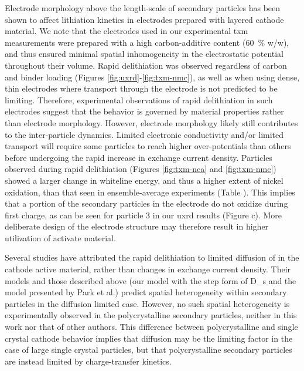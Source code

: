 \documentclass{article}
\begin{document}
Electrode morphology above the length-scale of secondary particles has
been shown to affect lithiation kinetics in electrodes prepared with
layered cathode
material\cite{battaglia2012,mukherjee2018,mukherjee2020,zhao2022}. We
note that the electrodes used in our experimental \gls{txm}
measurements were prepared with a high carbon-additive content
(\SI{60}{\percent} w/w), and thus ensured minimal spatial
inhomogeneity in the electrostatic potential throughout their
volume. Rapid delithiation was observed regardless of carbon and
binder loading (Figures \ref{fig:uxrd}-\ref{fig:txm-nmc}), as well as
when using dense, thin electrodes\cite{chueh2021} where transport
through the electrode is not predicted to be
limiting\cite{mukherjee2018}. Therefore, experimental observations of
rapid delithiation in such electrodes suggest that the behavior is
governed by material properties rather than electrode
morphology. However, electrode morphology likely still contributes to
the inter-particle dynamics. Limited electronic conductivity and/or
limited  transport will require some particles to reach
higher over-potentials than others before undergoing the rapid
increase in exchange current density. Particles observed during rapid
delithiation (Figures \ref{fig:txm-nca} and \ref{fig:txm-nmc}) showed
a larger change in whiteline energy, and thus a higher extent of
nickel oxidation, than that seen in ensemble-average experiments
(Table ). This implies that a portion
of the secondary particles in the electrode do not oxidize during
first charge, as can be seen for particle 3 in our \gls{uxrd} results
(Figure c). More deliberate design of the
electrode structure may therefore result in higher utilization of
activate material.

Several studies have attributed the rapid delithiation to limited
diffusion of  in the cathode active material\cite{rao2021,
  wang2020-6}, rather than changes in exchange current density. Their
models and those described above (our model with the step form of
\gls{D_s} and the model presented by Park et al.\cite{chueh2021})
predict spatial heterogeneity within secondary particles in the
diffusion limited case\cite{wang2020-6}. However, no such spatial
heterogeneity is experimentally observed in the polycrystalline
secondary particles, neither in this work nor that of other
authors\cite{chueh2021, zhao2022}. This difference between
polycrystalline and single crystal cathode behavior implies that
 diffusion may be the limiting factor in the case of large
single crystal particles, but that polycrystalline secondary particles
are instead limited by charge-transfer kinetics.
 
\end{document}
